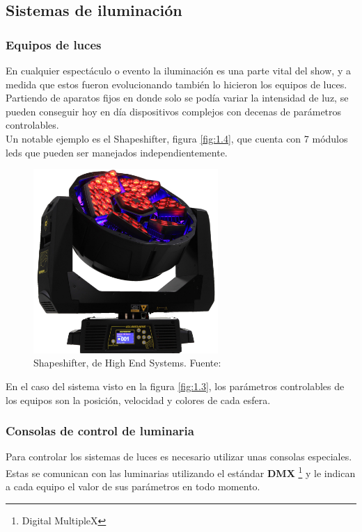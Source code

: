 

\subsection{Sistemas de iluminación} 
\subsubsection{Equipos de luces}

En cualquier espectáculo o evento la iluminación es una parte vital del show, y a medida que estos fueron evolucionando también lo hicieron los equipos de luces. Partiendo de aparatos fijos en donde solo se podía variar la intensidad de luz, se pueden conseguir hoy en día dispositivos complejos con decenas de parámetros controlables.\\
Un notable ejemplo es el Shapeshifter, figura \ref{fig:1.4}, que cuenta con 7 módulos leds que pueden ser manejados independientemente.

\begin{figure}[!ht]
	\centering
	\includegraphics[width=7cm,scale=1]{resources/1_4-shapeshifter.jpg}
	\caption{Shapeshifter, de High End Systems. Fuente: \cite{fig1_4} }
	\label{fig:\thefigure}
\end{figure}

En el caso del sistema visto en la figura \ref{fig:1.3}, los parámetros controlables de los equipos son la posición, velocidad y colores de cada esfera.

\subsubsection{Consolas de control de luminaria}

Para controlar los sistemas de luces es necesario utilizar unas consolas especiales. Estas se comunican con las luminarias utilizando el estándar \textbf{DMX} \footnote{Digital MultipleX} y le indican a cada equipo el valor de sus parámetros en todo momento.

